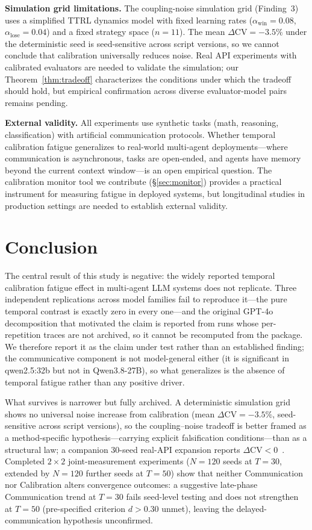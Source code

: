 \documentclass[11pt]{article}
\newcommand{\CV}{\ensuremath{\mathrm{CV}}}
\theoremstyle{definition}
\theoremstyle{remark}
\begin{document}
\textbf{Simulation grid limitations.} The coupling-noise simulation grid (Finding~3) uses a simplified TTRL dynamics model with fixed learning rates ($\alpha_{\text{win}}{=}0.08$, $\alpha_{\text{lose}}{=}0.04$) and a fixed strategy space ($n{=}11$). The mean $\Delta\CV{=}-3.5\%$ under the deterministic seed is seed-sensitive across script versions, so we cannot conclude that calibration universally reduces noise. Real API experiments with calibrated evaluators are needed to validate the simulation; our Theorem~\ref{thm:tradeoff} characterizes the conditions under which the tradeoff should hold, but empirical confirmation across diverse evaluator-model pairs remains pending.

\textbf{External validity.} All experiments use synthetic tasks (math, reasoning, classification) with artificial communication protocols. Whether temporal calibration fatigue generalizes to real-world multi-agent deployments---where communication is asynchronous, tasks are open-ended, and agents have memory beyond the current context window---is an open empirical question. The calibration monitor tool we contribute (\S\ref{sec:monitor}) provides a practical instrument for measuring fatigue in deployed systems, but longitudinal studies in production settings are needed to establish external validity.

\section{Conclusion}

The central result of this study is negative: the widely reported temporal calibration fatigue effect in multi-agent LLM systems does not replicate. Three independent replications across model families fail to reproduce it---the pure temporal contrast is exactly zero in every one---and the original GPT-4o decomposition that motivated the claim is reported from runs whose per-repetition traces are not archived, so it cannot be recomputed from the package. We therefore report it as the claim under test rather than an established finding; the communicative component is not model-general either (it is significant in qwen2.5:32b but not in Qwen3.8-27B), so what generalizes is the absence of temporal fatigue rather than any positive driver.

What survives is narrower but fully archived. A deterministic simulation grid shows no universal noise increase from calibration (mean $\Delta\CV = -3.5\%$, seed-sensitive across script versions), so the coupling--noise tradeoff is better framed as a method-specific hypothesis---carrying explicit falsification conditions---than as a structural law; a companion 30-seed real-API expansion reports $\Delta\CV < 0$~\citep{companion2026}. Completed $2 \times 2$ joint-measurement experiments ($N{=}120$ seeds at $T{=}30$, extended by $N{=}120$ further seeds at $T{=}50$) show that neither Communication nor Calibration alters convergence outcomes: a suggestive late-phase Communication trend at $T{=}30$ fails seed-level testing and does not strengthen at $T{=}50$ (pre-specified criterion $d > 0.30$ unmet), leaving the delayed-communication hypothesis unconfirmed.
\end{document}
